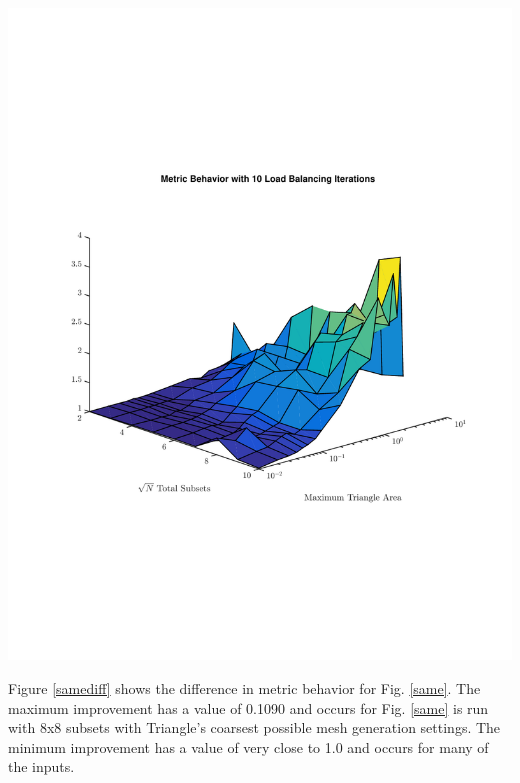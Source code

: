 \noindent\begin{minipage}{\textwidth}
\centering
\includegraphics[scale=0.80, trim = 0cm 2cm 0cm 2cm,clip]{figures/SameIter.pdf}
\label{sameiter}
\end{minipage}

Figure \ref{samediff} shows the difference in metric behavior for Fig. \ref{same}. The maximum improvement has a value of 0.1090 and occurs for Fig. \ref{same} is run with 8x8 subsets with Triangle's coarsest possible mesh generation settings. The minimum improvement has a value of very close to 1.0 and occurs for many of the inputs. 

